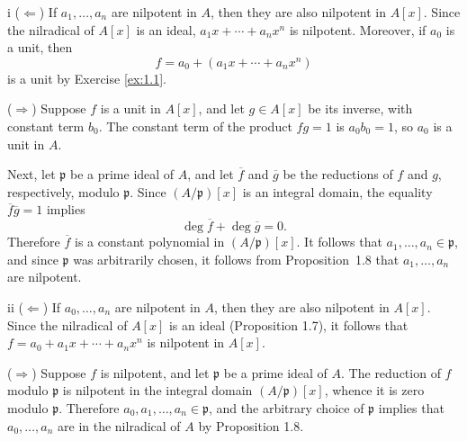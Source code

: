 \begin{partsolution}{1}{2}{i}
(\(\Leftarrow\))
If \(a_1,\ldots,a_n\) are nilpotent in \(A\), then they are also nilpotent in \(A[x]\).
Since the nilradical of \(A[x]\) is an ideal, \(a_1 x + \cdots + a_n x^n\) is nilpotent.
Moreover, if \(a_0\) is a unit, then
\begin{equation*}
f = a_0 + (a_1 x + \cdots + a_n x^n)
\end{equation*}
is a unit by Exercise \ref{ex:1.1}.

(\(\Rightarrow\))
Suppose \(f\) is a unit in \(A[x]\), and let \(g \in A[x]\) be its inverse, with constant term \(b_0\).
The constant term of the product \(f g = 1\) is \(a_0 b_0 = 1\), so \(a_0\) is a unit in \(A\).

Next, let \(\mathfrak p\) be a prime ideal of \(A\), and let \(\overline f\) and \(\overline g\) be the reductions of \(f\) and \(g\), respectively, modulo \(\mathfrak p\).
Since \((A/\mathfrak p)[x]\) is an integral domain, the equality \(\overline f \overline g = 1\) implies
\begin{equation*}
\deg \overline f + \deg \overline g = 0.
\end{equation*}
Therefore \(\overline f\) is a constant polynomial in \((A/\mathfrak p)[x]\).
It follows that \(a_1,\ldots,a_n \in \mathfrak p\), and since \(\mathfrak p\) was arbitrarily chosen, it follows from Proposition~1.8 that \(a_1,\ldots, a_n\) are nilpotent.
\end{partsolution}

\begin{partsolution}{1}{2}{ii}
(\(\Leftarrow\))
If \(a_0,\ldots,a_n\) are nilpotent in \(A\), then they are also nilpotent in \(A[x]\).
Since the nilradical of \(A[x]\) is an ideal (Proposition 1.7), it follows that \(f = a_0 + a_1 x + \cdots + a_n x^n\) is nilpotent in \(A[x]\).

(\(\Rightarrow\))
Suppose \(f\) is nilpotent, and let \(\mathfrak p\) be a prime ideal of \(A\).
The reduction of \(f\) modulo \(\mathfrak p\) is nilpotent in the integral domain \((A/\mathfrak p)[x]\), whence it is zero modulo \(\mathfrak p\).
Therefore \(a_0,a_1,\ldots,a_n \in \mathfrak p\), and the arbitrary choice of \(\mathfrak p\) implies that \(a_0,\ldots,a_n\) are in the nilradical of \(A\) by Proposition 1.8.
\end{partsolution}

